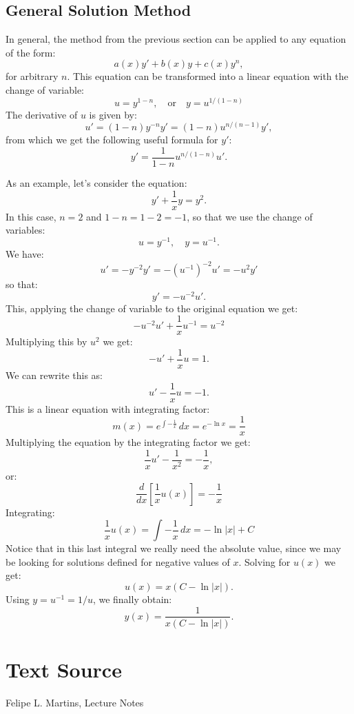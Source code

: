 \documentclass{ximera}
\begin{document}
\subsection*{General Solution Method}

In general, the method from the previous section can be applied to any equation of the form:
\[
a(x)y'+b(x)y+c(x)y^n,
\]
for arbitrary $n$. This equation can be transformed into a linear equation with the change of variable:
\[
u=y^{1-n},\quad\text{or}\quad y=u^{1/(1-n)}
\]
The derivative of $u$ is given by:
\[
u'=(1-n)y^{-n}y'=(1-n)u^{n/(n-1)}y',
\]
from which we get the following useful formula for $y'$:
\[
y'=\frac{1}{1-n}u^{n/(1-n)}u'.
\]

\begin{example}\label{ex:bernoulli1}
As an example, let's consider the equation:
\[
y'+\frac{1}{x}y=y^2.
\]
In this case, $n=2$ and $1-n=1-2=-1$, so that we use the change of variables:
\[
u=y^{-1},\quad y=u^{-1}.
\]
We have:
\[
u'=-y^{-2}y'=-(u^{-1})^{-2}u'=-u^2y'
\]
so that:
\[
y'=-u^{-2}u'.
\]
This, applying the change of variable to the original equation we get:
\[
-u^{-2}u'+\frac{1}{x}u^{-1}=u^{-2}
\]
Multiplying this by $u^2$ we get:
\[
-u'+\frac{1}{x}u=1.
\]
We can rewrite this as:
\[
u'-\frac{1}{x}u=-1.
\]
This is a linear equation with integrating factor:
\[
m(x)=e^{\int -\frac{1}{x}}\,dx=e^{-\ln x}=\frac{1}{x}
\]
Multiplying the equation by the integrating factor we get:
\[
\frac{1}{x}u'-\frac{1}{x^2}=-\frac{1}{x},
\]
or:
\[
\frac{d}{dx}\left[\frac{1}{x}u(x)\right]=-\frac{1}{x}
\]
Integrating:
\[
\frac{1}{x}u(x)=\int -\frac{1}{x}\,dx=-\ln |x| +C
\]
Notice that in this last integral we really need the absolute value, since we may be looking for solutions defined for negative values of $x$. Solving for $u(x)$ we get:
\[
u(x)=x(C-\ln|x|).
\]
Using $y=u^{-1}=1/u$, we finally obtain:
\[
y(x)=\frac{1}{x(C-\ln|x|)}.
\]
\end{example}


\section*{Text Source}
Felipe L. Martins, Lecture Notes
\end{document}
